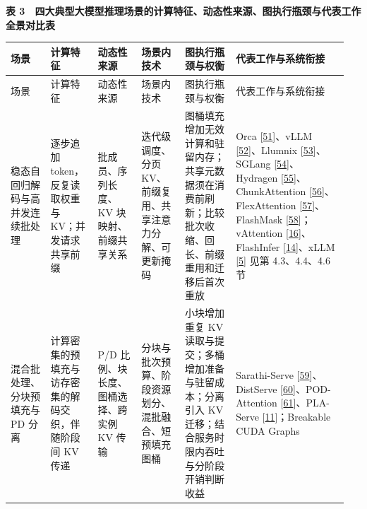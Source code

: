 \documentclass[UTF8,10.5pt,fontset=windows]{ctexart}
\newcommand{\TableTitle}[1]{\par\Needspace{5\baselineskip}\begingroup\centering\bfseries\fontsize{9.5}{13}\selectfont #1\par\endgroup\nobreak}
\begin{document}
\begin{landscape}
\begingroup
\fontsize{8.6}{11.8}\selectfont
\setlength{\tabcolsep}{2.5pt}
\setlength{\emergencystretch}{0.5\linewidth}
\renewcommand{\arraystretch}{1.10}
\TableTitle{\textbf{表
3　四大典型大模型推理场景的计算特征、动态性来源、图执行瓶颈与代表工作全景对比表}}
\begin{longtable}[c]{@{}>{\raggedright\arraybackslash}p{0.1146\linewidth}
>{\raggedright\arraybackslash}p{0.1337\linewidth}
>{\raggedright\arraybackslash}p{0.1241\linewidth}
>{\raggedright\arraybackslash}p{0.1241\linewidth}
>{\raggedright\arraybackslash}p{0.1432\linewidth}
>{\raggedright\arraybackslash}p{0.3151\linewidth}@{}}
\toprule
场景 & 计算特征 & 动态性来源 & 场景内技术 & 图执行瓶颈与权衡 &
代表工作与系统衔接 \\
\midrule\endfirsthead
\toprule
场景 & 计算特征 & 动态性来源 & 场景内技术 & 图执行瓶颈与权衡 &
代表工作与系统衔接 \\
\midrule\endhead
\bottomrule\endfoot
\bottomrule\endlastfoot
稳态自回归解码与高并发连续批处理 & 逐步追加 token，反复读取权重与
KV；并发请求共享前缀 & 批成员、序列长度、KV 块映射、前缀共享关系 &
迭代级调度、分页 KV、前缀复用、共享注意力分解、可更新掩码 &
图桶填充增加无效计算和驻留内存；共享元数据须在消费前刷新；比较批次收缩、回长、前缀重用和迁移后首次重放
& Orca {[}\protect\hyperlink{ref-yu2022orca}{51}{]}、vLLM
{[}\protect\hyperlink{ref-kwon2023vllm}{52}{]}、Llumnix
{[}\protect\hyperlink{ref-sun2024llumnix}{53}{]}、SGLang
{[}\protect\hyperlink{ref-zheng2024sglang}{54}{]}、Hydragen
{[}\protect\hyperlink{ref-juravsky2024hydragen}{55}{]}、ChunkAttention
{[}\protect\hyperlink{ref-ye2024chunkattention}{56}{]}、FlexAttention
{[}\protect\hyperlink{ref-dong2025flexattention}{57}{]}、FlashMask
{[}\protect\hyperlink{ref-wang2025flashmask}{58}{]}；vAttention
{[}\protect\hyperlink{ref-prabhu2025vattention}{16}{]}、FlashInfer
{[}\protect\hyperlink{ref-ye2025flashinfer}{14}{]}、xLLM
{[}\protect\hyperlink{ref-liu2025xllm}{5}{]} 见第 4.3、4.4、4.6 节 \\
混合批处理、分块预填充与 PD 分离 &
计算密集的预填充与访存密集的解码交织，伴随阶段间 KV 传递 & P/D
比例、块长度、图桶选择、跨实例 KV 传输 &
分块与批次预算、阶段资源划分、混批融合、短预填充图桶 & 小块增加重复 KV
读取与提交；多桶增加准备与驻留成本；分离引入 KV
迁移；结合服务时限内吞吐与分阶段开销判断收益 & Sarathi-Serve
{[}\protect\hyperlink{ref-agrawal2024sarathi}{59}{]}、DistServe
{[}\protect\hyperlink{ref-zhong2024distserve}{60}{]}、POD-Attention
{[}\protect\hyperlink{ref-kamath2025pod}{61}{]}、PLA-Serve
{[}\protect\hyperlink{ref-she2026plaserve}{11}{]}；Breakable CUDA Graphs

\end{longtable}
\end{landscape}
\end{document}
